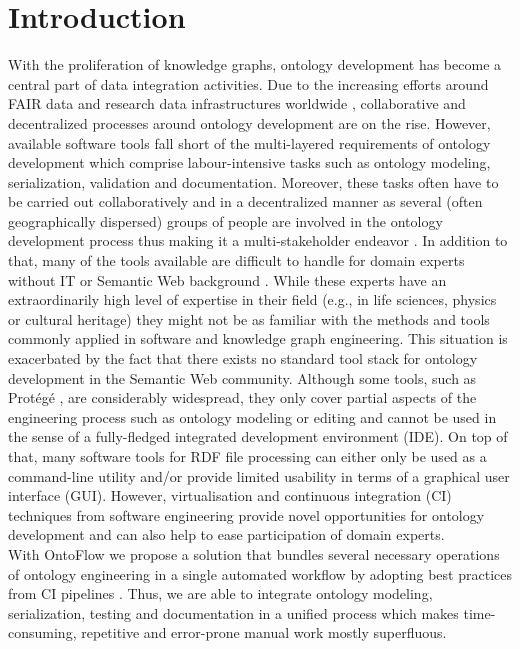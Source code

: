 \documentclass[runningheads]{llncs}
\begin{document}

\section{Introduction}
With the proliferation of knowledge graphs, ontology development has become a central part of data integration activities. Due to the increasing efforts around FAIR data and research data infrastructures worldwide \cite{fair}, collaborative and decentralized processes around ontology development are on the rise. However, available software tools fall short of the multi-layered requirements of ontology development which comprise labour-intensive tasks such as ontology modeling, serialization, validation and documentation. Moreover, these tasks often have to be carried out collaboratively and in a decentralized manner as several (often geographically dispersed) groups of people are involved in the ontology development process thus making it a multi-stakeholder endeavor \cite{sure}. In addition to that, many of the tools available are difficult to handle for domain experts without IT or Semantic Web background \cite{tudorache}. While these experts have an extraordinarily high level of expertise in their field (e.g., in life sciences, physics or cultural heritage) they might not be as familiar with the methods and tools commonly applied in software and knowledge graph engineering. This situation is exacerbated by the fact that there exists no standard tool stack for ontology development in the Semantic Web community. Although some tools, such as Protégé \cite{protege}, are considerably widespread, they only cover partial aspects of the engineering process such as ontology modeling or editing and cannot be used in the sense of a fully-fledged integrated development environment (IDE). On top of that, many software tools for RDF file processing can either only be used as a command-line utility and/or provide limited usability in terms of a graphical user interface (GUI). However, virtualisation and continuous integration (CI) techniques from software engineering provide novel opportunities for ontology development \cite{fowler} and can also help to ease participation of domain experts.\\
With OntoFlow we propose a solution that bundles several necessary operations of ontology engineering in a single automated workflow by adopting best practices from CI pipelines \cite{humble}. Thus, we are able to integrate ontology modeling, serialization, testing and documentation in a unified process which makes time-consuming, repetitive and error-prone manual work mostly superfluous. 
\end{document}
